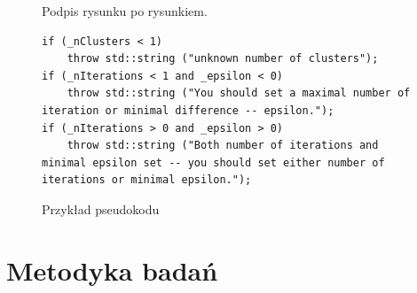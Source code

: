  
\begin{figure}
\centering
{}
\caption{Podpis rysunku po rysunkiem.}
\label{fig:2}
\end{figure}


\begin{figure}
\begin{lstlisting}
if (_nClusters < 1)
	throw std::string ("unknown number of clusters");
if (_nIterations < 1 and _epsilon < 0)
	throw std::string ("You should set a maximal number of iteration or minimal difference -- epsilon.");
if (_nIterations > 0 and _epsilon > 0)
	throw std::string ("Both number of iterations and minimal epsilon set -- you should set either number of iterations or minimal epsilon.");
\end{lstlisting}
\caption{Przykład pseudokodu}
\end{figure}


\section{Metodyka badań}

